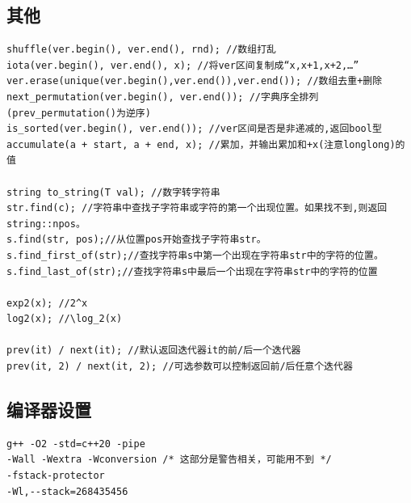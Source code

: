 \subsection{其他}
\begin{lstlisting}[caption={}]
shuffle(ver.begin(), ver.end(), rnd); //数组打乱
iota(ver.begin(), ver.end(), x); //将ver区间复制成“x,x+1,x+2,…”
ver.erase(unique(ver.begin(),ver.end()),ver.end()); //数组去重+删除
next_permutation(ver.begin(), ver.end()); //字典序全排列(prev_permutation()为逆序)
is_sorted(ver.begin(), ver.end()); //ver区间是否是非递减的,返回bool型
accumulate(a + start, a + end, x); //累加，并输出累加和+x(注意longlong)的值

string to_string(T val); //数字转字符串
str.find(c); //字符串中查找子字符串或字符的第一个出现位置。如果找不到,则返回string::npos。
s.find(str, pos);//从位置pos开始查找子字符串str。
s.find_first_of(str);//查找字符串s中第一个出现在字符串str中的字符的位置。
s.find_last_of(str);//查找字符串s中最后一个出现在字符串str中的字符的位置

exp2(x); //2^x
log2(x); //\log_2(x)

prev(it) / next(it); //默认返回迭代器it的前/后一个迭代器
prev(it, 2) / next(it, 2); //可选参数可以控制返回前/后任意个迭代器
\end{lstlisting}


\subsection{编译器设置}
\begin{lstlisting}[caption={}]
g++ -O2 -std=c++20 -pipe 
-Wall -Wextra -Wconversion /* 这部分是警告相关，可能用不到 */
-fstack-protector 
-Wl,--stack=268435456
\end{lstlisting}
